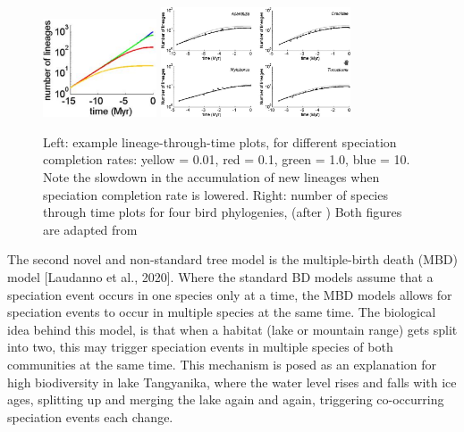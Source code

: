 \begin{figure}[H]

  \includegraphics[width=0.3\textwidth]{eteinne_rosindell_2011_ltt.png}
  \includegraphics[width=0.5\textwidth]{eteinne_rosindell_2011.png}
  \caption{
    Left: example lineage-through-time plots, for different 
    speciation completion rates: yellow = 0.01, red = 0.1, green = 1.0, blue = 10.
    Note the slowdown in the accumulation of new lineages when speciation completion
    rate is lowered.
    Right: number of species through time plots for four bird phylogenies, 
    (after \cite{phillimore2008density})
    Both figures are adapted from \cite{etienne2012prolonging}
 }
  \label{fig:etienne2012prolonging}
\end{figure}

The second novel and non-standard tree model is the multiple-birth 
death (MBD) model [Laudanno et al., 2020].
Where the standard BD models assume that a speciation event occurs in one
species only at a time, the MBD models allows for speciation events
to occur in multiple species at the same time.
The biological idea behind this model, is that when a 
habitat (lake or mountain range) gets split into two, 
this may trigger speciation events in multiple species
of both communities at the same time. 
This mechanism is posed as an
explanation for high biodiversity in lake Tangyanika,
where the water level rises and falls with ice ages,
splitting up and merging the lake again and again, 
triggering co-occurring speciation events each change. 

%
%
%


